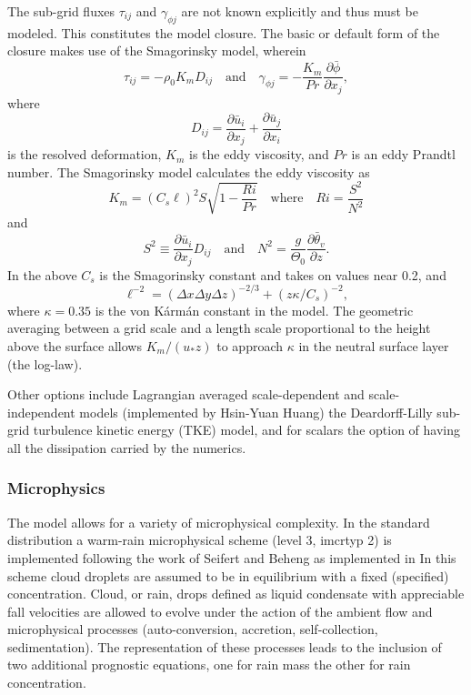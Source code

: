 \documentclass[11pt,a4paper]{article}
\begin{document}
The sub-grid fluxes $\tau_{ij}$ and $\gamma_{\phi j}$ are not known
explicitly and thus must be modeled.  This constitutes the model
closure.  The basic or default form of the closure makes use of the
Smagorinsky model, wherein
\begin{equation}
\tau_{ij} = - \rho_0 K_mD_{ij} \quad \text{and} \quad \gamma_{\phi j}
= - \frac{K_m}{Pr} \frac{\partial \bar{\phi}} {\partial x_j},
\end{equation}
where \[D_{ij} = \frac{\partial \bar{u}_i}{\partial x_j} +
\frac{\partial \bar{u}_j}{\partial x_i}\] is the resolved deformation,
$K_m$ is the eddy viscosity, and $Pr$ is an eddy Prandtl number.  The
Smagorinsky model calculates the eddy viscosity as
\begin{equation}
K_m = (C_s \ell)^2 S \sqrt{1 - \frac{Ri}{Pr}} \quad \text{where} \quad
Ri =
\frac{S^2}{N^2}
\end{equation}
and
\begin{equation}
S^2 \equiv \frac{\partial \bar{u}_i}{\partial x_j} D_{ij} \quad
\text{and} \quad N^2 = \frac{g}{\Theta_0} \frac{\partial
\bar{\theta}_v}{\partial z}.
\end{equation}
In the above $C_s$ is the Smagorinsky constant and takes on values
near 0.2, and
\[ \ell^{-2} = (\Delta x \Delta y \Delta z)^{-2/3} + (z\kappa/C_s)^{-2},
\]  where $\kappa=0.35$ is the von K\'arm\'an constant in the model.   The
geometric averaging between a grid scale and a length scale proportional
to the height above the surface allows $K_m/(u_*z)$ to approach
$\kappa$ in the neutral surface layer (the log-law).

Other options include Lagrangian averaged scale-dependent and
scale-independent models (implemented by Hsin-Yuan Huang) the
Deardorff-Lilly sub-grid turbulence kinetic energy (TKE) model, and
for scalars the option of having all the dissipation carried by the
numerics.

\subsubsection{Microphysics}

The model allows for a variety of microphysical complexity.  In the
standard distribution a warm-rain microphysical scheme (level 3,
imcrtyp 2) is implemented following the work of Seifert and Beheng
\cite{Seife:2001} as implemented in \cite{Me:2008} In this scheme
cloud droplets are assumed to be in equilibrium with a fixed
(specified) concentration.  Cloud, or rain, drops defined as liquid
condensate with appreciable fall velocities are allowed to evolve
under the action of the ambient flow and microphysical processes
(auto-conversion, accretion, self-collection, sedimentation).  The
representation of these processes leads to the inclusion of two
additional prognostic equations, one for rain mass the other for rain
concentration.
\end{document}

